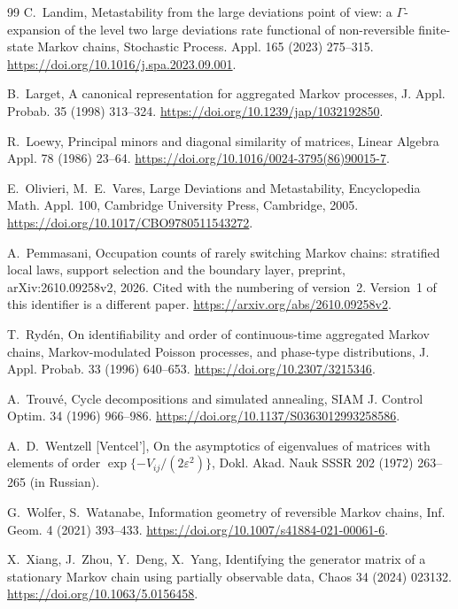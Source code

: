 \begin{thebibliography}{99}
C.~Landim, Metastability from the large deviations point of view: a $\Gamma$-expansion of the
level two large deviations rate functional of non-reversible finite-state Markov chains,
Stochastic Process. Appl. 165 (2023) 275--315. \url{https://doi.org/10.1016/j.spa.2023.09.001}.

B.~Larget, A canonical representation for aggregated Markov processes, J. Appl. Probab. 35 (1998)
313--324. \url{https://doi.org/10.1239/jap/1032192850}.

R.~Loewy, Principal minors and diagonal similarity of matrices, Linear Algebra Appl. 78 (1986)
23--64. \url{https://doi.org/10.1016/0024-3795(86)90015-7}.

E.~Olivieri, M.~E.~Vares, Large Deviations and Metastability, Encyclopedia Math. Appl. 100,
Cambridge University Press, Cambridge, 2005. \url{https://doi.org/10.1017/CBO9780511543272}.

A.~Pemmasani, Occupation counts of rarely switching Markov chains: stratified local laws,
support selection and the boundary layer, preprint, arXiv:2610.09258v2, 2026. Cited with the
numbering of version~2. Version~1 of this identifier is a different paper.
\url{https://arxiv.org/abs/2610.09258v2}.

T.~Ryd\'en, On identifiability and order of continuous-time aggregated Markov chains,
Markov-modulated Poisson processes, and phase-type distributions, J. Appl. Probab. 33 (1996)
640--653. \url{https://doi.org/10.2307/3215346}.

A.~Trouv\'e, Cycle decompositions and simulated annealing, SIAM J. Control Optim. 34 (1996)
966--986. \url{https://doi.org/10.1137/S0363012993258586}.

A.~D.~Wentzell [Ventcel'], On the asymptotics of eigenvalues of matrices with elements of order
$\exp\{-V_{ij}/(2\varepsilon^2)\}$, Dokl. Akad. Nauk SSSR 202 (1972) 263--265 (in Russian).

\ifarxivbuild
{}
G.~Wolfer, S.~Watanabe, Information geometry of reversible Markov chains, Inf. Geom. 4 (2021)
393--433. \url{https://doi.org/10.1007/s41884-021-00061-6}.
\fi

X.~Xiang, J.~Zhou, Y.~Deng, X.~Yang, Identifying the generator matrix of a stationary Markov chain
using partially observable data, Chaos 34 (2024) 023132. \url{https://doi.org/10.1063/5.0156458}.

\end{thebibliography}
